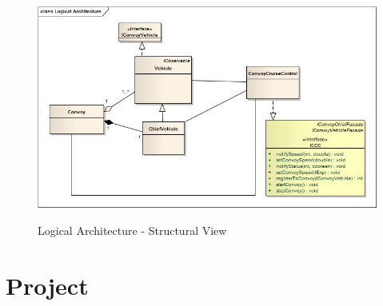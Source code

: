 \documentclass{llncs}
\newcommand{\labelsec}[1]{\label{sec:#1}}
\newcommand{\labelfig}[1]{\label{fig:#1}}
\begin{document}
\begin{figure}
   \centering
   \includegraphics[scale = 0.6]{../Diagrams/Logical_Architecture.jpg}\\
  \caption{Logical Architecture - Structural View}\labelfig{testTypes}
\end{figure}




\newpage

\section{Project}
\labelsec{Project}
\end{document}
